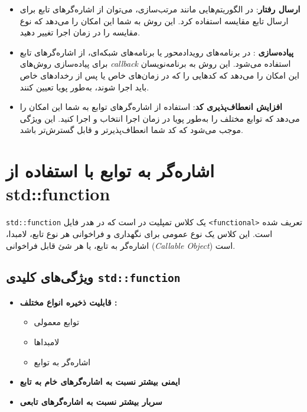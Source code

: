 \documentclass[12pt, a4paper]{report}
\begin{document}
\begin{itemize}
	\item \textbf{ارسال رفتار}: 
	در الگوریتم‌هایی مانند مرتب‌سازی، می‌توان از اشاره‌گرهای تابع برای ارسال تابع مقایسه استفاده کرد. این روش به شما این امکان را می‌دهد که نوع مقایسه را در زمان اجرا تغییر دهید.
	
	\item \textbf{پیاده‌سازی }: 
	در برنامه‌های رویدادمحور یا برنامه‌های شبکه‌ای، از اشاره‌گرهای تابع برای پیاده‌سازی روش‌های \textit{callback} استفاده می‌شود. این روش به برنامه‌نویسان این امکان را می‌دهد که کدهایی را که در زمان‌های خاص یا پس از رخدادهای خاص باید اجرا شوند، به‌طور پویا تعیین کنند.
	
	\item \textbf{افزایش انعطاف‌پذیری کد}: 
	استفاده از اشاره‌گرهای توابع به شما این امکان را می‌دهد که توابع مختلف را به‌طور پویا در زمان اجرا انتخاب و اجرا کنید. این ویژگی موجب می‌شود که کد شما انعطاف‌پذیرتر و قابل گسترش‌تر باشد.
\end{itemize}


\section{اشاره‌گر به توابع با استفاده از std::function}

\texttt{std::function} یک کلاس تمپلیت در  است که در هدر فایل \texttt{<functional>} تعریف شده است. این کلاس یک نوع عمومی برای نگهداری و فراخوانی هر نوع تابع، لامبدا، اشاره‌گر به تابع، یا هر شئ قابل فراخوانی (\textit{Callable Object}) است.

\subsection{ویژگی‌های کلیدی \texttt{std::function}}
\begin{itemize}
	\item \textbf{قابلیت ذخیره انواع مختلف :}
	\begin{itemize}
		\item توابع معمولی
		\item لامبداها
		\item اشاره‌گر به توابع
	\end{itemize}
	\item \textbf{ایمنی بیشتر نسبت به اشاره‌گرهای خام به تابع} 
	\item \textbf{سربار بیشتر نسبت‌ به اشاره‌گرهای تابعی} 
	
\end{itemize}
\end{document}

